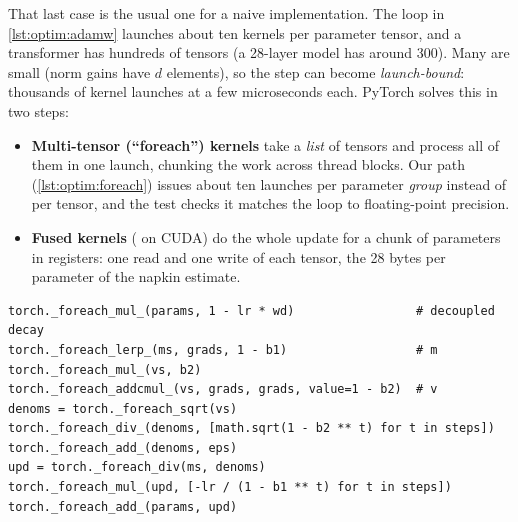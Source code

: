 That last case is the usual one for a naive implementation. The loop in \cref{lst:optim:adamw}
launches about ten kernels per parameter tensor, and a transformer has hundreds of tensors (a
28-layer model has around 300). Many are small (norm gains have $d$ elements), so the step can
become \emph{launch-bound}: thousands of kernel launches at a few microseconds each. PyTorch
solves this in two steps:

\begin{itemize}
  \item \textbf{Multi-tensor (``foreach'') kernels} take a \emph{list} of tensors and process
        all of them in one launch, chunking the work across thread blocks. Our
         path (\cref{lst:optim:foreach}) issues about ten launches per
        parameter \emph{group} instead of per tensor, and the test checks it matches the loop to
        floating-point precision.
  \item \textbf{Fused kernels} ( on CUDA) do the whole update
        for a chunk of parameters in registers: one read and one write of each tensor, the 28
        bytes per parameter of the napkin estimate.
\end{itemize}

\begin{lstlisting}[caption={The same AdamW update over a whole parameter group with multi-tensor kernels.},label={lst:optim:foreach}]
torch._foreach_mul_(params, 1 - lr * wd)                 # decoupled decay
torch._foreach_lerp_(ms, grads, 1 - b1)                  # m
torch._foreach_mul_(vs, b2)
torch._foreach_addcmul_(vs, grads, grads, value=1 - b2)  # v
denoms = torch._foreach_sqrt(vs)
torch._foreach_div_(denoms, [math.sqrt(1 - b2 ** t) for t in steps])
torch._foreach_add_(denoms, eps)
upd = torch._foreach_div(ms, denoms)
torch._foreach_mul_(upd, [-lr / (1 - b1 ** t) for t in steps])
torch._foreach_add_(params, upd)
\end{lstlisting}

